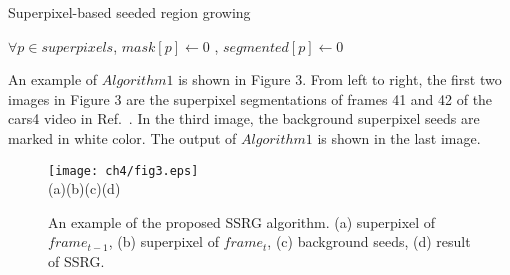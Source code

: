 \renewcommand{\algorithmcfname}{算法}
\begin{algorithm}
\caption{Superpixel-based seeded region growing}
\label{ch4:alg:ssrg}
\LinesNumbered
{}
 $\forall p \in superpixels$, $mask[p] \leftarrow 0$ , $segmented[p] \leftarrow 0$ \;

\end{algorithm}

An example of $Algorithm 1$ is shown in Figure 3. From left to right, the first two images in Figure 3 are the superpixel segmentations of frames 41 and 42 of the cars4 video in Ref.~. In the third image, the background superpixel seeds are marked in white color. The output of $Algorithm 1$ is shown in the last image.
\begin{figure*}[!htbp]
\begin{center}
\texttt{[image: ch4/fig3.eps]}\\
  (a)\quad\quad\quad\quad\quad\quad\quad\quad(b)\quad\quad\quad\quad\quad\quad\quad\quad(c)\quad\quad\quad\quad\quad\quad\quad\quad(d)
\end{center}

\caption{An example of the proposed SSRG algorithm. (a) superpixel of $frame_{t-1}$, (b) superpixel of $frame_{t}$, (c) background seeds, (d) result of SSRG.}
\label{fig:3}       %
\end{figure*}
